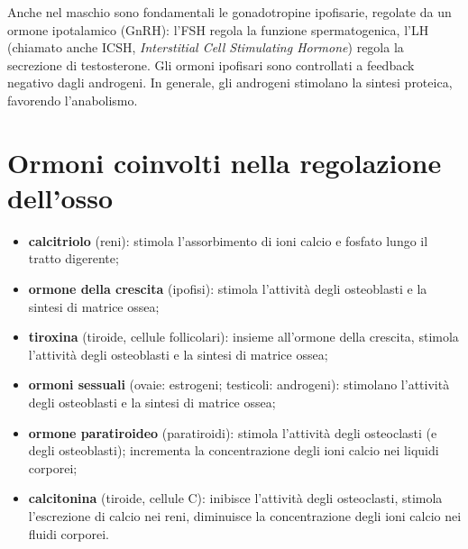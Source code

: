 Anche nel maschio sono fondamentali le gonadotropine ipofisarie, regolate
da un ormone ipotalamico (GnRH): l'FSH regola la funzione spermatogenica,
l'LH (chiamato anche ICSH, \textit{Interstitial Cell Stimulating Hormone})
regola la secrezione di testosterone. Gli ormoni ipofisari sono controllati
a feedback negativo dagli androgeni. In generale, gli androgeni stimolano
la sintesi proteica, favorendo l'anabolismo.

\section{Ormoni coinvolti nella regolazione dell'osso}

\begin{itemize}
  \item \textbf{calcitriolo} (reni): stimola l'assorbimento di ioni calcio
    e fosfato lungo il tratto digerente;
  \item \textbf{ormone della crescita} (ipofisi): stimola l'attività degli
    osteoblasti e la sintesi di matrice ossea;
  \item \textbf{tiroxina} (tiroide, cellule follicolari): insieme
    all'ormone della crescita, stimola l'attività degli osteoblasti e la
    sintesi di matrice ossea;
  \item \textbf{ormoni sessuali} (ovaie: estrogeni; testicoli: androgeni):
    stimolano l'attività degli osteoblasti e la sintesi di matrice ossea;
  \item \textbf{ormone paratiroideo} (paratiroidi): stimola l'attività
    degli osteoclasti (e degli osteoblasti); incrementa la concentrazione
    degli ioni calcio nei liquidi corporei;
  \item \textbf{calcitonina} (tiroide, cellule C): inibisce l'attività
    degli osteoclasti, stimola l'escrezione di calcio nei reni, diminuisce
    la concentrazione degli ioni calcio nei fluidi corporei.
\end{itemize}
